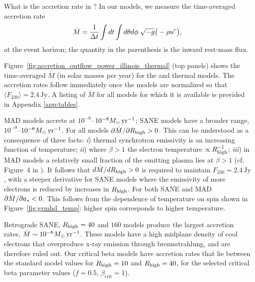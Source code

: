 
What is the accretion rate in \sgra?  In our models, we measure the time-averaged accretion rate
\begin{equation}
  \dot{M} = \frac{1}{\Delta t}\int dt\int d\theta d\phi\hspace{0.1cm}\sqrt{-g}\big(-\rho u^{r}\big),
\end{equation}
at the event horizon; the quantity in the parenthesis is the inward rest-mass flux.

Figure~\ref{fig:accretion_outflow_power_illinois_thermal} (top panels) shows the time-averaged $\dot{M}$ (in solar masses per year) for the \kharma and \bhac thermal models.  The accretion rates follow immediately once the models are normalized so that $\langle F_{230}\rangle = 2.4\,\mathrm{Jy}$.  A listing of $\dot{M}$ for all models for which it is available is provided in Appendix \ref{app:tables}.

MAD models accrete at $10^{-9}$--$10^{-8} M_{\odot}\,\mathrm{yr}^{-1}$; SANE models have a broader range, $10^{-9}$--$10^{-6} M_{\odot}\,\mathrm{yr}^{-1}$.  For all models $\partial\dot{M}/\partial R_\mathrm{high} > 0$.  This can be understood as a consequence of three facts: \emph{i}) thermal synchrotron emissivity is an increasing function of temperature; \emph{ii}) where $\beta > 1$ the electron temperature $\propto R_\mathrm{high}^{-1}$; \emph{iii}) in MAD models a relatively small fraction of the emitting plasma lies at $\beta > 1$ (cf. Figure~4 in ).  It follows that $d\dot{M}/dR_\mathrm{high} > 0$ is required to maintain $F_{230} = 2.4\,\mathrm{Jy}$, with a steeper derivative for SANE models where the emissivity of more electrons is reduced by increases in $R_\mathrm{high}$.  For both SANE and MAD $\partial\dot{M}/\partial a_* < 0$.  This follows from the dependence of temperature on spin shown in Figure~\ref{fig:grmhd_temp}: higher spin corresponds to higher temperature.

Retrograde SANE, $R_\mathrm{high}=40$ and $160$ models produce the largest accretion rates, $\dot{M} \sim 10^{-6}M_{\odot}\,\mathrm{yr}^{-1}$.  These models have a high midplane density of cool electrons that overproduce x-ray emission through bremsstrahlung, and are therefore ruled out.   Our critical beta models have accretion rates that lie between the standard model values for $R_\mathrm{high} = 10$ and $R_\mathrm{high} = 40$, for the selected critical beta parameter values ($f=0.5$, $\beta_\mathrm{crit}=1$).

